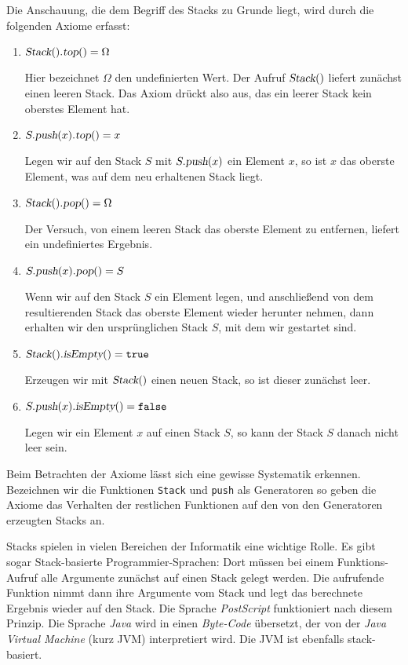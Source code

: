 Die Anschauung, die dem  Begriff des Stacks zu Grunde liegt, wird durch die folgenden Axiome
erfasst:
\begin{enumerate}
\item $\textsl{Stack}().\textsl{top}() = \Omega$

      Hier bezeichnet $\Omega$ den undefinierten Wert.  Der Aufruf $\textsl{Stack}()$
      liefert zun\"achst einen leeren Stack.  Das Axiom dr\"uckt also aus,
      das ein leerer Stack kein oberstes Element hat.
\item $S.\textsl{push}(x).\textsl{top}() = x$

      Legen wir auf den Stack $S$ mit $S.\textsl{push}(x)$ ein Element $x$, so 
      ist $x$ das oberste Element, was auf dem neu erhaltenen Stack liegt.
\item $\textsl{Stack}().\textsl{pop}() = \Omega$

      Der Versuch, von einem leeren Stack das oberste Element zu entfernen,
      liefert ein undefiniertes Ergebnis.
\item $S.\textsl{push}(x).\textsl{pop}() = S$

      Wenn wir auf den Stack $S$
      ein Element legen, und anschlie{\ss}end von dem resultierenden Stack das
      oberste Element wieder herunter nehmen, dann erhalten wir den
      urspr\"unglichen Stack $S$, mit dem wir gestartet sind.
\item $\textsl{Stack}().\textsl{isEmpty}() = \mathtt{true}$

      Erzeugen wir mit $\textsl{Stack}()$ einen neuen Stack, so ist dieser
      zun\"achst leer.
\item $S.\textsl{push}(x).\textsl{isEmpty}() = \mathtt{false}$

      Legen wir ein Element $x$ auf einen Stack $S$, so kann der Stack $S$
      danach nicht leer sein.
\end{enumerate}
Beim Betrachten der Axiome l\"asst sich eine gewisse Systematik erkennen.
Bezeichnen wir die Funktionen \texttt{Stack} und \texttt{push} als Generatoren
so geben die Axiome das Verhalten der restlichen Funktionen auf den von den Generatoren
erzeugten Stacks an. 

Stacks spielen in vielen Bereichen der Informatik eine wichtige Rolle.  Es gibt
sogar Stack-basierte Programmier-Sprachen: Dort m\"ussen bei einem
Funktions-Aufruf alle Argumente zun\"achst auf einen Stack gelegt werden.  Die
aufrufende Funktion nimmt dann ihre Argumente vom Stack und legt das berechnete
Ergebnis wieder auf den Stack.  Die Sprache \textsl{PostScript} funktioniert
nach diesem Prinzip.  Die Sprache \textsl{Java} wird in einen \emph{Byte-Code}
\"ubersetzt, der von der \emph{Java Virtual Machine} (kurz JVM) interpretiert
wird.  Die JVM ist ebenfalls stack-basiert.

